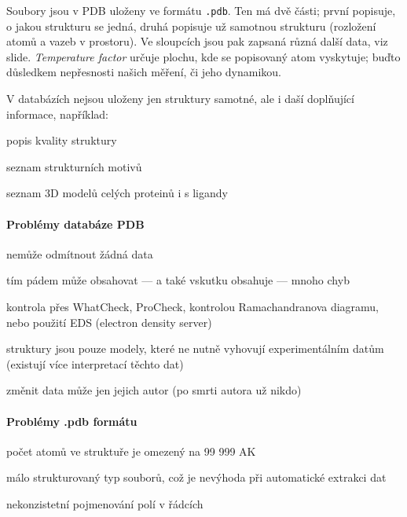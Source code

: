 \documentclass[DIV=8]{scrreprt}
\newcommand{\inlinecode}{\texttt}
\begin{document}
Soubory jsou v PDB uloženy ve formátu \inlinecode{.pdb}. Ten má dvě části; první popisuje, o jakou strukturu se jedná, druhá popisuje už samotnou strukturu (rozložení atomů a vazeb v prostoru). Ve sloupcích jsou pak zapsaná různá další data, viz slide. \emph{Temperature factor} určuje plochu, kde se popisovaný atom vyskytuje; buďto důsledkem nepřesnosti našich měření, či jeho dynamikou.

V databázích nejsou uloženy jen struktury samotné, ale i daší doplňující informace, například:
\begin{myItemize}[nosep]
    \item popis kvality struktury
    \item seznam strukturních motivů
    \item seznam 3D modelů celých proteinů i s ligandy
\end{myItemize}



\paragraph{Problémy databáze PDB}
\begin{myItemize}[nosep]
    \item nemůže odmítnout žádná data
\begin{myItemize}[nosep]
    \item tím pádem může obsahovat --- a také vskutku obsahuje --- mnoho chyb
    \item kontrola přes WhatCheck, ProCheck, kontrolou Ramachandranova diagramu, nebo použití EDS (electron density server)
\end{myItemize}

    \item struktury jsou pouze modely, které ne nutně vyhovují experimentálním datům (existují více interpretací těchto dat)
    \item změnit data může jen jejich autor (po smrti autora už nikdo)
\end{myItemize}



\paragraph{Problémy .pdb formátu }
\begin{myItemize}[nosep]
    \item počet atomů ve struktuře je omezený na 99 999 AK
    \item málo strukturovaný typ souborů, což je nevýhoda při automatické extrakci dat
    \item nekonzistetní pojmenování polí v řádcích
\end{myItemize}
\end{document}
